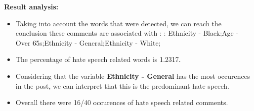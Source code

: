 \documentclass[11pt]{article}
\begin{document}
\textbf{\Large Result analysis:}

\begin{itemize}\item Taking into account the words that were detected, we can reach the conclusion these comments are associated with : : Ethnicity - Black;Age - Over 65s;Ethnicity - General;Ethnicity - White;%

\item The percentage of hate speech related words is 1.2317.

\item Considering that the variable \textbf{Ethnicity - General} has the most occurences in the post, we can interpret that this is the predominant hate speech.

\item Overall there were 16/40 occurences of hate speech related comments.\end{itemize}
\end{document}
